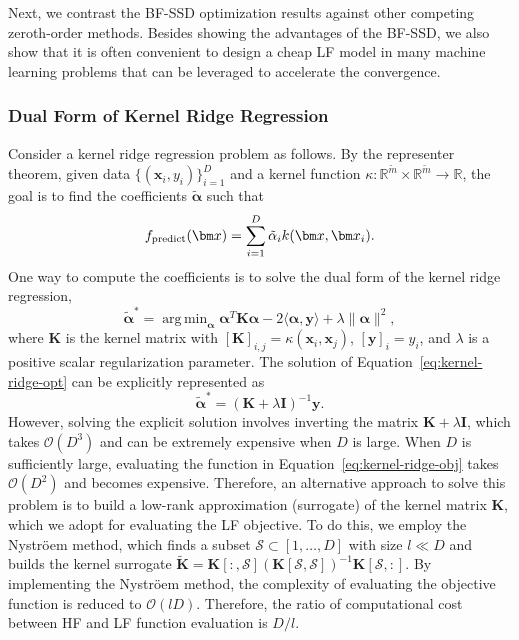 \documentclass[10pt]{article} %
\numberwithin{equation}{section}
\theoremstyle{plain}
\theoremstyle{definition}
\newcommand{\<}{\langle}
\renewcommand{\>}{\rangle}
\renewcommand{\(}{\left(}
\renewcommand{\)}{\right)}
\renewcommand{\[}{\left[}
\renewcommand{\]}{\right]}
\DeclareMathOperator*{\argmin}{arg\,min}
\def\R{{\mathbb R}}
\def\R{{\mathbb R}}
\begin{document}
Next, we contrast the BF-SSD optimization results against other competing zeroth-order methods. Besides showing the advantages of the BF-SSD, we also show that it is often convenient to design a cheap LF model in many machine learning problems that can be leveraged to accelerate the convergence. 

\subsubsection{Dual Form of Kernel Ridge Regression}
\label{ssec:kernel-ridge}
Consider a kernel ridge regression problem as follows. By the representer theorem, given data $\{(\bm x_i, y_i)\}_{i=1}^D$ and a kernel function $\kappa:\R^{\tilde{m}}\times\R^{\tilde{m}}\to\R$, the goal is to find the coefficients $\tilde{\bm \alpha}$ such that
\begin{equation}
\label{eq:kernel-ridge-obj}
f_\textup{predict}(\bm x) = \sum_{i=1}^D \tilde{\alpha}_i k(\bm x, \bm x_i).
\end{equation}
One way to compute the coefficients is to solve the dual form of the kernel ridge regression,
\begin{equation}
\label{eq:kernel-ridge-opt}
\tilde{\bm\alpha}^* = \argmin_{\bm\alpha} \bm \alpha^T\bm K\bm \alpha - 2\langle \bm \alpha,\bm y\rangle + \lambda\lVert\bm\alpha\rVert^2,
\end{equation}
where $\bm K$ is the kernel matrix with $[\bm K]_{i, j} = \kappa(\bm x_i, \bm x_j)$, $[\bm y]_i = y_i$, and $\lambda$ is a positive scalar regularization parameter. The solution of Equation~\eqref{eq:kernel-ridge-opt} can be explicitly represented as 
\begin{equation}
\tilde{\bm\alpha }^* = (\bm K + \lambda\bm I)^{-1}\bm y.
\end{equation}
However, solving the explicit solution involves inverting the matrix $\bm K + \lambda\bm I$, which takes $\mathcal{O}(D^3)$ and can be extremely expensive when $D$ is large. When $D$ is sufficiently large, evaluating the function in Equation~\eqref{eq:kernel-ridge-obj} takes $\mathcal{O}(D^2)$ and becomes expensive. Therefore, an alternative approach to solve this problem is to build a low-rank approximation (surrogate) of the kernel matrix $\bm K$, which we adopt for evaluating the LF objective. To do this, we employ the Nystr\"oem method, which finds a subset $\mathcal{S}\subset [1,\dots,D]$ with size $l\ll D$ and builds the kernel surrogate $\tilde{\bm K} = \bm K[:,\mathcal{S}](\bm K[\mathcal{S},\mathcal{S}])^{-1}\bm K[\mathcal{S}, :]$. By implementing the Nystr\"oem method, the complexity of evaluating the objective function is reduced to $\mathcal{O}(lD)$. %
Therefore, the ratio of computational cost between HF and LF function evaluation is $D/l$. 
\end{document}
